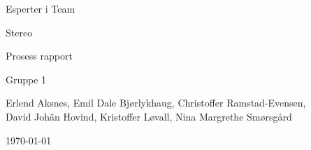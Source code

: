 \begin{titlepage}
\begin{center}
\vspace*{1in}
{\LARGE Esperter i Team}
\par
\vspace{1cm}


\begin{figure}[ht!]
\centering
\label{overflow}
\end{figure}


{\LARGE Stereo}
\par
\vspace{0.6in}
{\LARGE Prosess rapport}
\par
\vspace{0.2in}
{\Large Gruppe 1}
\par
\vfill
\par
\vspace{0.5in}
Erlend Aksnes, Emil Dale Bjørlykhaug, Christoffer Ramstad-Evensen, \\David Johän Hovind, Kristoffer Løvall, Nina Margrethe Smørsgård
\par
\vspace{0.4cm}
\today
\end{center}
\end{titlepage}
